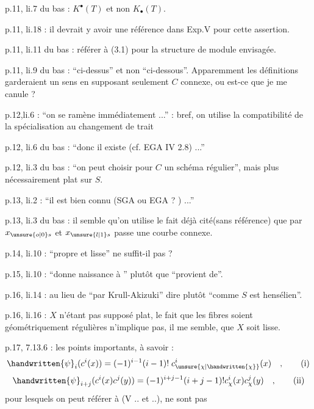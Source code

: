 
p.11, li.7 du bas : $K^{\bullet}(T)$ et non $K_{\bullet}(T)$.

p.11, li.18 : il devrait y avoir une référence dans Exp.V pour cette assertion.

p.11, li.11 du bas : référer à (3.1) pour la structure de module envisagée.

p.11, li.9 du bas : ``ci-dessus'' et non ``ci-dessous''. Apparemment les définitions garderaient un sens en supposant seulement $C$ connexe, ou est-ce que je me canule ?

p.12,li.6 : ``on se ramène immédiatement ...'' : bref, on utilise la compatibilité de la spécialisation au changement de trait

p.12, li.6 du bas : ``donc il existe (cf. EGA IV 2.8) ...''

p.12, li.3 du bas : ``on peut choisir pour $C$ un schéma régulier'', mais plus nécessairement plat sur $S$.

p.13, li.2 : ``il est bien connu (SGA ou EGA ? ) ...''


p.13, li.3 du bas : il semble qu'on utilise le fait déjà cité(sans référence) que par $x_{\unsure{o|0}s}$ et $x_{\unsure{l|1}s}$ passe une courbe connexe.

p.14, li.10 : ``propre et lisse'' ne suffit-il pas ?

p.15, li.10 : ``donne naissance à '' plutôt que ``provient de''.

p.16, li.14 : au lieu de ``par Krull-Akizuki'' dire plutôt ``comme $S$ est hensélien''.

p.16, li.16 : $X$ n'étant pas supposé plat, le fait que les fibres soient géométriquement régulières n'implique pas, il me semble, que $X$ soit lisse.


p.17, 7.13.6 : les points importants, à savoir :
\begingroup
\makeatletter\tagsleft@true\makeatother
\[
\handwritten{\psi}_i(c^i(x)) = (-1)^{i-1}(i-1)!\;c^i_{\unsure{\chi|\handwritten{\chi}}}(x)\quad,\tag*{(i)}
\]
\[
\handwritten{\psi}_{i+j}(c^i(x)c^j(y)) = (-1)^{i+j-1}(i+j-1)!c^i_{\chi}(x)c^j_{\chi}(y)\quad,\tag*{(ii)}
\]
\endgroup
pour lesquels on peut référer à (V .. et ..), ne sont pas
\clearpage
